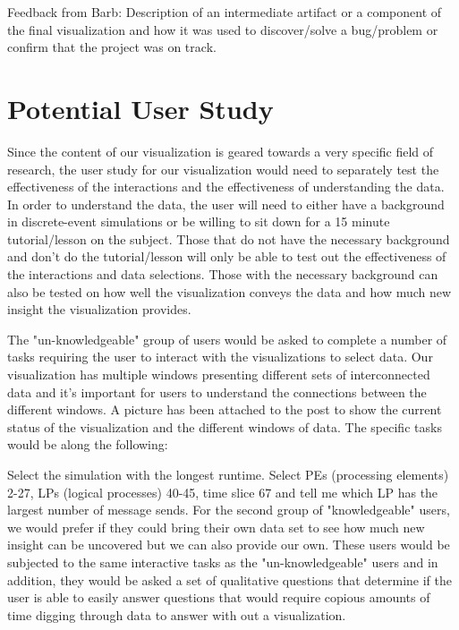 \documentclass{acm_proc_article-sp}
\begin{document}
Feedback from Barb: Description of an intermediate artifact or a component of the final visualization and how it was used to discover/solve a bug/problem or confirm that the project was on track.

\section{Potential User Study}
Since the content of our visualization is geared towards a very specific field of research, the user study for our visualization would need to separately test the effectiveness of the interactions and the effectiveness of understanding the data. In order to understand the data, the user will need to either have a background in discrete-event simulations or be willing to sit down for a 15 minute tutorial/lesson on the subject. Those that do not have the necessary background and don't do the tutorial/lesson will only be able to test out the effectiveness of the interactions and data selections. Those with the necessary background can also be tested on how well the visualization conveys the data and how much new insight the visualization provides.

The "un-knowledgeable" group of users would be asked to complete a number of tasks requiring the user to interact with the visualizations to select data. Our visualization has multiple windows presenting different sets of interconnected data and it's important for users to understand the connections between the different windows. A picture has been attached to the post to show the current status of the visualization and the different windows of data. The specific tasks would be along the following:

Select the simulation with the longest runtime. Select PEs (processing elements) 2-27,  LPs (logical processes) 40-45, time slice 67 and tell me which LP has the largest number of message sends.
For the second group of "knowledgeable" users, we would prefer if they could bring their own data set to see how much new insight can be uncovered but we can also provide our own. These users would be subjected to the same interactive tasks as the "un-knowledgeable" users and in addition, they would be asked a set of qualitative questions that determine if the user is able to easily answer questions that would require copious amounts of time digging through data to answer with out a visualization.
\end{document}
